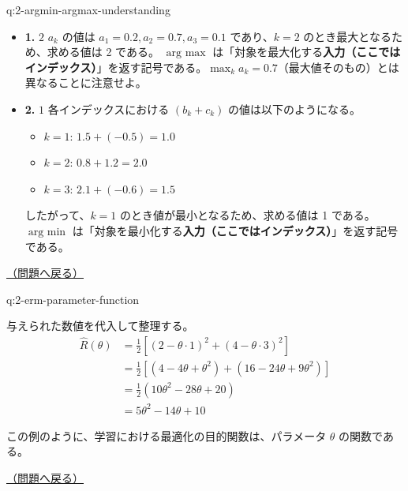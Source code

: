 \documentclass[
  pandoc]{bxjsarticle}
\providecommand{\tightlist}{%
  \setlength{\itemsep}{0pt}\setlength{\parskip}{0pt}}
\begin{document}
\begin{answerbox}[phantomlabel=a:2-argmin-argmax-understanding]{q:2-argmin-argmax-understanding}

\begin{itemize}
\item
  \textbf{1.} \textbf{\(2\)} \(a_k\) の値は
  \(a_1 = 0.2, a_2 = 0.7, a_3 = 0.1\) であり、\(k=2\)
  のとき最大となるため、求める値は 2 である。 \(\mathop{\arg~\max}\)
  は「対象を最大化する\textbf{入力（ここではインデックス）}」を返す記号である。\(\max_{k} a_k = 0.7\)（最大値そのもの）とは異なることに注意せよ。
\item
  \textbf{2.} \textbf{\(1\)} 各インデックスにおける \((b_k + c_k)\)
  の値は以下のようになる。

  \begin{itemize}
  \tightlist
  \item
    \(k=1\): \(1.5 + (-0.5) = 1.0\)
  \item
    \(k=2\): \(0.8 + 1.2 = 2.0\)
  \item
    \(k=3\): \(2.1 + (-0.6) = 1.5\)
  \end{itemize}

  したがって、\(k=1\) のとき値が最小となるため、求める値は 1 である。
  \(\mathop{\arg~\min}\)
  は「対象を最小化する\textbf{入力（ここではインデックス）}」を返す記号である。
\end{itemize}

\hfill 

\hyperref[q:2-argmin-argmax-understanding]{（問題へ戻る）}

\end{answerbox}

\begin{answerbox}[phantomlabel=a:2-erm-parameter-function]{q:2-erm-parameter-function}

与えられた数値を代入して整理する。 \begin{align*}
\hat{R}(\theta) &= \frac{1}{2} \left[ (2 - \theta \cdot 1)^2 + (4 - \theta \cdot 3)^2 \right] \\
&= \frac{1}{2} \left[ (4 - 4\theta + \theta^2) + (16 - 24\theta + 9\theta^2) \right] \\
&= \frac{1}{2} (10\theta^2 - 28\theta + 20) \\
&= 5\theta^2 - 14\theta + 10
\end{align*}

この例のように、学習における最適化の目的関数は、パラメータ \(\theta\)
の関数である。

\hfill 

\hyperref[q:2-erm-parameter-function]{（問題へ戻る）}

\end{answerbox}
\end{document}
